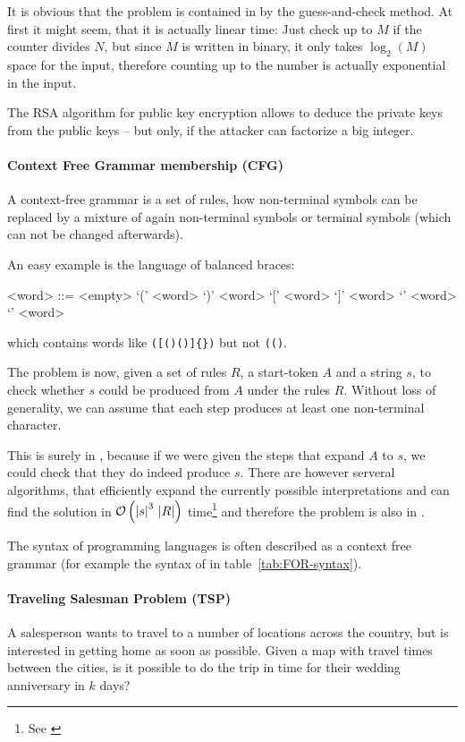 It is obvious that the problem is contained in \NPTIME by the guess-and-check 
method. At first it might seem, that it is actually linear time: Just check 
up to $M$ if the counter divides $N$, but since $M$ is written in binary, it 
only takes $\log_2(M)$ space for the input, therefore counting up to the 
number is actually exponential in the input.
\begin{example}[Relevance] 
	The RSA algorithm for public key encryption allows to deduce the private keys
	from the public keys -- but only, if the attacker can factorize a big
	integer.
\end{example}

\paragraph{Context Free Grammar membership (CFG)}
A context-free grammar is a set of rules, how non-terminal symbols can be replaced by 
a mixture of again non-terminal symbols or terminal symbols (which can not be 
changed afterwards).

An easy example is the language of balanced braces:

\begin{grammar}
	<word> ::= <empty>
						\alt `(' <word> `)' <word>
						\alt `[' <word> `]' <word>
						\alt `{' <word> `}' <word>
\end{grammar}
which contains words like \texttt{([()()]\{\})} but not \texttt{(()}.

The problem is now, given a set of rules $R$, a start-token $A$ and a string 
$s$, to check whether $s$ could be produced from $A$ under the rules $R$. 
Without loss of generality, we can assume that each step produces at least 
one non-terminal character\citationneeded.

This is surely in \NPTIME, because if we were given the steps that expand $A$ 
to $s$, we could check that they do indeed produce $s$. There are however 
serveral algorithms, that efficiently expand the currently possible 
interpretations and can find the solution in
$\mathcal{O}\left( \left|s\right|^3\,\left|R\right| \right)$ time\footnote{See 
	\cite{sipser2006introduction}} and therefore the problem is also in \PTIME.
\begin{example}[Relevance]
	The syntax of programming languages is often
	described as a context free grammar (for example
	the syntax of \FOR in table~\ref{tab:FOR-syntax}).
\end{example}

\paragraph{Traveling Salesman Problem (TSP)}
A salesperson wants to travel to a number of locations across the country, 
but is interested in getting home as soon as possible. Given a map with 
travel times between the cities, is it possible to do the trip in time for 
their wedding anniversary in $k$ days?

